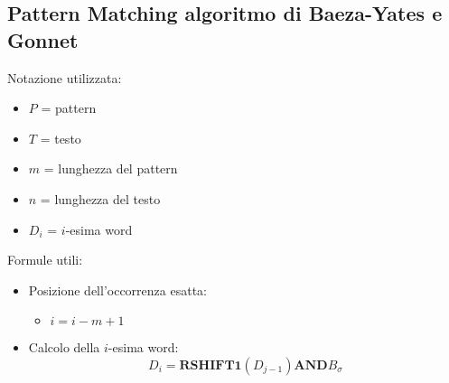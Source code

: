 \subsection{Pattern Matching algoritmo di Baeza-Yates e Gonnet}
Notazione utilizzata:
\begin{itemize}
    \item $P$ = pattern
    \item $T$ = testo
    \item $m$ = lunghezza del pattern
    \item $n$ = lunghezza del testo
    \item $D_i$ = $i$-esima word
\end{itemize}
Formule utili:
\begin{itemize}
    \item Posizione dell'occorrenza esatta:
          \begin{itemize}
              \item $i = i - m + 1$
          \end{itemize}
    \item Calcolo della $i$-esima word:
          \begin{equation}
              D_i = \textbf{RSHIFT1}(D_{j - 1}) \textbf{AND} B_{\sigma}
          \end{equation}
\end{itemize}